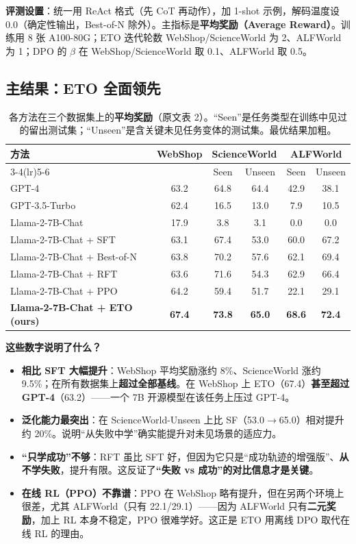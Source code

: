 \documentclass[11pt,UTF8,fontset=fandol]{ctexart}
\begin{document}
\textbf{评测设置}：统一用 ReAct 格式（先 CoT 再动作），加 1-shot 示例，解码温度设 0.0（确定性输出，Best-of-N 除外）。主指标是\textbf{平均奖励（Average Reward）}。训练用 8 张 A100-80G；ETO 迭代轮数 WebShop/ScienceWorld 为 2、ALFWorld 为 1；DPO 的 $\beta$ 在 WebShop/ScienceWorld 取 0.1、ALFWorld 取 0.5。

\subsection{主结果：ETO 全面领先}

\begin{table}[H]\centering
\caption{各方法在三个数据集上的\textbf{平均奖励}（原文表 2）。“Seen”是任务类型在训练中见过的留出测试集；“Unseen”是含关键未见任务变体的测试集。最优结果加粗。}
\label{tab:main}
\begin{tabular}{lccccc}
\toprule
\multirow{2}{*}{方法} & \multirow{2}{*}{WebShop} & \multicolumn{2}{c}{ScienceWorld} & \multicolumn{2}{c}{ALFWorld} \\
\cmidrule(lr){3-4}\cmidrule(lr){5-6}
 & & Seen & Unseen & Seen & Unseen \\
\midrule
GPT-4                       & 63.2 & 64.8 & 64.4 & 42.9 & 38.1 \\
GPT-3.5-Turbo               & 62.4 & 16.5 & 13.0 & 7.9  & 10.5 \\
Llama-2-7B-Chat             & 17.9 & 3.8  & 3.1  & 0.0  & 0.0  \\
Llama-2-7B-Chat + SFT       & 63.1 & 67.4 & 53.0 & 60.0 & 67.2 \\
Llama-2-7B-Chat + Best-of-N & 63.8 & 70.2 & 57.6 & 62.1 & 69.4 \\
Llama-2-7B-Chat + RFT       & 63.6 & 71.6 & 54.3 & 62.9 & 66.4 \\
Llama-2-7B-Chat + PPO       & 64.2 & 59.4 & 51.7 & 22.1 & 29.1 \\
\textbf{Llama-2-7B-Chat + ETO (ours)} & \textbf{67.4} & \textbf{73.8} & \textbf{65.0} & \textbf{68.6} & \textbf{72.4} \\
\bottomrule
\end{tabular}
\end{table}

\textbf{这些数字说明了什么？}
\begin{itemize}[leftmargin=2em,itemsep=3pt]
\item \textbf{相比 SFT 大幅提升}：WebShop 平均奖励涨约 8\%、ScienceWorld 涨约 9.5\%；在所有数据集上\textbf{超过全部基线}。在 WebShop 上 ETO（67.4）\textbf{甚至超过 GPT-4}（63.2）——一个 7B 开源模型在该任务上压过 GPT-4。
\item \textbf{泛化能力最突出}：在 ScienceWorld-Unseen 上比 SF（53.0$\to$65.0）相对提升约 20\%。说明“从失败中学”确实能提升对未见场景的适应力。
\item \textbf{“只学成功”不够}：RFT 虽比 SFT 好，但因为它只是“成功轨迹的增强版”、\textbf{从不学失败}，提升有限。这反证了\textbf{“失败 vs 成功”的对比信息才是关键}。
\item \textbf{在线 RL（PPO）不靠谱}：PPO 在 WebShop 略有提升，但在另两个环境上很差，尤其 ALFWorld（只有 22.1/29.1）——因为 ALFWorld 只有\textbf{二元奖励}，加上 RL 本身不稳定，PPO 很难学好。这正是 ETO 用离线 DPO 取代在线 RL 的理由。
\end{itemize}
\end{document}
